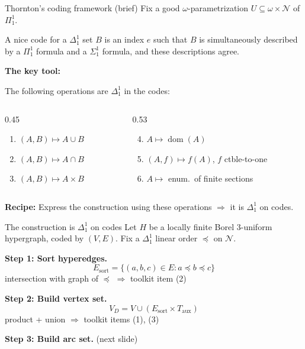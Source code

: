 \documentclass[aspectratio=169, 12pt]{beamer}
\newcommand{\NN}{\mathcal{N}}
\DeclareMathOperator{\dom}{dom}
\begin{document}
\begin{frame}{Thornton's coding framework (brief)}
Fix a good $\omega$-parametrization $U \subseteq \omega \times \NN$ of $\Pi^1_1$.

\medskip

A \alert{nice code} for a $\Delta^1_1$ set $B$ is an index $e$ such that $B$ is simultaneously described by a $\Pi^1_1$ formula and a $\Sigma^1_1$ formula, and these descriptions agree.

\medskip

\textbf{The key tool:}

\begin{lemma}[Toolkit]
The following operations are $\Delta^1_1$ in the codes:
\begin{columns}[t]
\begin{column}{0.45\textwidth}
\begin{enumerate}
	\item $(A,B) \mapsto A \cup B$
	\item $(A,B) \mapsto A \cap B$
	\item $(A,B) \mapsto A \times B$
\end{enumerate}
\end{column}
\begin{column}{0.53\textwidth}
\begin{enumerate}\setcounter{enumi}{3}
	\item $A \mapsto \dom(A)$
	\item $(A,f) \mapsto f(A)$, $f$ ctble-to-one
	\item $A \mapsto$ enum.\ of finite sections
\end{enumerate}
\end{column}
\end{columns}
\end{lemma}

\medskip

\textbf{Recipe:} Express the construction using these operations $\Rightarrow$ it is $\Delta^1_1$ on codes.
\end{frame}

\begin{frame}{The construction is $\Delta^1_1$ on codes}
Let $H$ be a locally finite Borel 3-uniform hypergraph, coded by $(V, E)$. Fix a $\Delta^1_1$ linear order $\preceq$ on $\NN$.

\bigskip

\textbf{Step 1: Sort hyperedges.}
$$E_{\mathrm{sort}} = \{(a,b,c) \in E : a \preceq b \preceq c\}$$
\hfill intersection with graph of $\preceq$ $\Rightarrow$ toolkit item (2) \checkmark

\pause
\bigskip

\textbf{Step 2: Build vertex set.}
$$V_D = V \cup (E_{\mathrm{sort}} \times T_{\mathrm{aux}})$$
\hfill product + union $\Rightarrow$ toolkit items (1), (3) \checkmark

\pause
\bigskip

\textbf{Step 3: Build arc set.} (next slide)
\end{frame}
\end{document}
